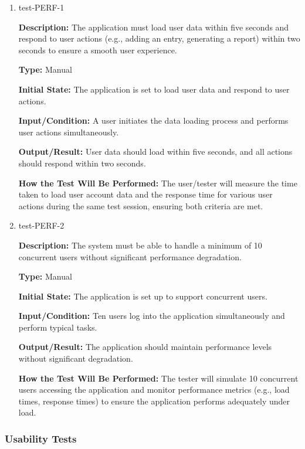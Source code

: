 \documentclass[12pt, titlepage]{article}
\begin{document}
\begin{enumerate}

\item{test-PERF-1\\}

\textbf{Description:} The application must load user data within five seconds and respond to user actions (e.g., adding an entry, generating a report) within two seconds to ensure a smooth user experience.

\textbf{Type:} Manual
					
\textbf{Initial State:} The application is set to load user data and respond to user actions.
					
\textbf{Input/Condition:} A user initiates the data loading process and performs user actions simultaneously.
					
\textbf{Output/Result:} User data should load within five seconds, and all actions should respond within two seconds.
					
\textbf{How the Test Will Be Performed:} The user/tester will measure the time taken to load user account data and the response time for various user actions during the same test session, ensuring both criteria are met.

\item{test-PERF-2\\}

\textbf{Description:} The system must be able to handle a minimum of 10 concurrent users without significant performance degradation.

\textbf{Type:} Manual
					
\textbf{Initial State:} The application is set up to support concurrent users.
					
\textbf{Input/Condition:} Ten users log into the application simultaneously and perform typical tasks.
					
\textbf{Output/Result:} The application should maintain performance levels without significant degradation.
					
\textbf{How the Test Will Be Performed:} The tester will simulate 10 concurrent users accessing the application and monitor performance metrics (e.g., load times, response times) to ensure the application performs adequately under load.

\end{enumerate}

\subsubsection{Usability Tests}
\end{document}
